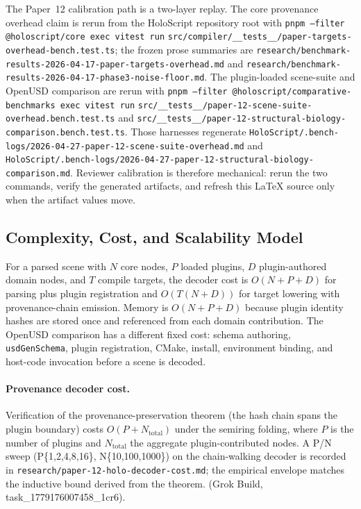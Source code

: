 \documentclass[sigconf,nonacm]{acmart}
\begin{document}
The Paper~12 calibration path is a two-layer replay. The core provenance
overhead claim is rerun from the HoloScript repository root with
\texttt{pnpm --filter @holoscript/core exec vitest run}
\texttt{src/compiler/\_\_tests\_\_/paper-targets-overhead-bench.test.ts};
the frozen prose summaries are
\texttt{research/benchmark-results-2026-04-17-paper-targets-overhead.md}
and
\texttt{research/benchmark-results-2026-04-17-phase3-noise-floor.md}.
The plugin-loaded scene-suite and OpenUSD comparison are rerun with
\texttt{pnpm --filter @holoscript/comparative-benchmarks exec vitest run}
\texttt{src/\_\_tests\_\_/paper-12-scene-suite-overhead.bench.test.ts}
and
\texttt{src/\_\_tests\_\_/paper-12-structural-biology-comparison.bench.test.ts}.
Those harnesses regenerate
\texttt{HoloScript/.bench-logs/2026-04-27-paper-12-scene-suite-overhead.md}
and
\texttt{HoloScript/.bench-logs/2026-04-27-paper-12-structural-biology-comparison.md}.
Reviewer calibration is therefore mechanical: rerun the two commands, verify
the generated artifacts, and refresh this \LaTeX{} source only when the
artifact values move.

\subsection{Complexity, Cost, and Scalability Model}
\label{sec:paper12-cost-scaling}

For a parsed scene with $N$ core nodes, $P$ loaded plugins, $D$ plugin-authored
domain nodes, and $T$ compile targets, the decoder cost is
$O(N + P + D)$ for parsing plus plugin registration and $O(T(N + D))$ for
target lowering with provenance-chain emission. Memory is $O(N + P + D)$
because plugin identity hashes are stored once and referenced from each
domain contribution. The OpenUSD comparison has a different fixed cost:
schema authoring, \texttt{usdGenSchema}, plugin registration, CMake, install,
environment binding, and host-code invocation before a scene is decoded.

\paragraph{Provenance decoder cost.}
Verification of the provenance-preservation theorem (the hash chain spans the plugin boundary) costs $O(P + N_\text{total})$ under the semiring folding, where $P$ is the number of plugins and $N_\text{total}$ the aggregate plugin-contributed nodes. A P/N sweep (P\in\{1,2,4,8,16\}, N\in\{10,100,1000\}) on the chain-walking decoder is recorded in \texttt{research/paper-12-holo-decoder-cost.md}; the empirical envelope matches the inductive bound derived from the theorem. (Grok Build, task\_1779176007458\_1cr6).
\end{document}
